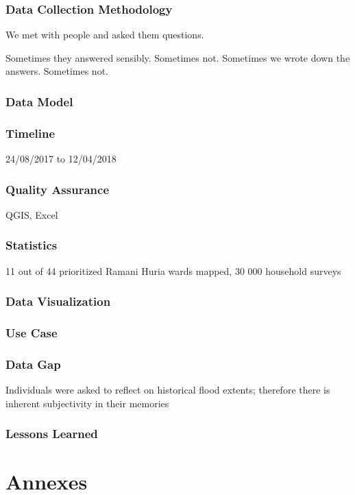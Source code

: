 \documentclass[a4paper,12pt,twoside]{article}
\begin{document}
\subsubsection{Data Collection Methodology}

We met with people and asked them questions.

Sometimes they answered sensibly. Sometimes not. Sometimes we wrote down the answers. Sometimes not.

\subsubsection{Data Model}

\subsubsection{Timeline}
24/08/2017 to 12/04/2018

\subsubsection{Quality Assurance}
QGIS, Excel

\subsubsection{Statistics}
11 out of 44 prioritized Ramani Huria wards mapped, 30 000 household surveys

\subsubsection{Data Visualization}

\subsubsection{Use Case}

\subsubsection{Data Gap}
Individuals were asked to reflect on historical flood extents; therefore there is inherent subjectivity in their memories

\subsubsection{Lessons Learned}

\newpage
\section{Annexes}
\end{document}
